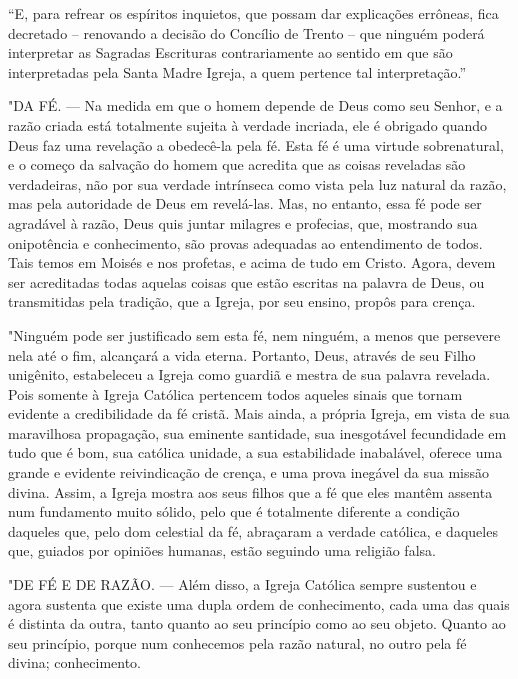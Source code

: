 \documentclass[11pt,a5paper,twoside,openany]{book}
\begin{document}
“E, para refrear os espíritos inquietos, que possam dar explicações errôneas, fica decretado – renovando a decisão do Concílio de Trento – que ninguém poderá interpretar as Sagradas Escrituras contrariamente ao sentido em que são interpretadas pela Santa Madre Igreja, a quem pertence tal interpretação.”

"DA FÉ. — Na medida em que o homem depende de Deus como seu Senhor, e a razão criada está totalmente sujeita à verdade incriada, ele é obrigado quando Deus faz uma revelação a obedecê-la pela fé. Esta fé é uma virtude sobrenatural, e o começo da salvação do homem que acredita que as coisas reveladas são verdadeiras, não por sua verdade intrínseca como vista pela luz natural da razão, mas pela autoridade de Deus em revelá-las. Mas, no entanto, essa fé pode ser agradável à razão, Deus quis juntar milagres e profecias, que, mostrando sua onipotência e conhecimento, são provas adequadas ao entendimento de todos. Tais temos em Moisés e nos profetas, e acima de tudo em Cristo. Agora, devem ser acreditadas todas aquelas coisas que estão escritas na palavra de Deus, ou transmitidas pela tradição, que a Igreja, por seu ensino, propôs para crença.

"Ninguém pode ser justificado sem esta fé, nem ninguém, a menos que persevere nela até o fim, alcançará a vida eterna. Portanto, Deus, através de seu Filho unigênito, estabeleceu a Igreja como guardiã e mestra de sua palavra revelada. Pois somente à Igreja Católica pertencem todos aqueles sinais que tornam evidente a credibilidade da fé cristã. Mais ainda, a própria Igreja, em vista de sua maravilhosa propagação, sua eminente santidade, sua inesgotável fecundidade em tudo que é bom, sua católica unidade, a sua estabilidade inabalável, oferece uma grande e evidente reivindicação de crença, e uma prova inegável da sua missão divina. Assim, a Igreja mostra aos seus filhos que a fé que eles mantêm assenta num fundamento muito sólido, pelo que é totalmente diferente a condição daqueles que, pelo dom celestial da fé, abraçaram a verdade católica, e daqueles que, guiados por opiniões humanas, estão seguindo uma religião falsa.

"DE FÉ E DE RAZÃO. — Além disso, a Igreja Católica sempre sustentou e agora sustenta que existe uma dupla ordem de conhecimento, cada uma das quais é distinta da outra, tanto quanto ao seu princípio como ao seu objeto. Quanto ao seu princípio, porque num conhecemos pela razão natural, no outro pela fé divina; conhecimento.
\end{document}
